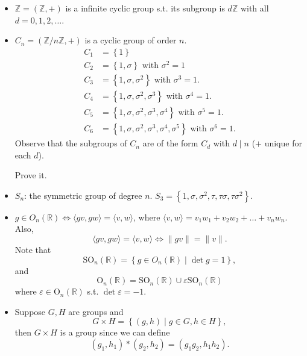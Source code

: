 \begin{prev}
    \vphantom{text}
    \begin{itemize}
        \item \(\mathbb{Z} = (\mathbb{Z} , +)\) is a infinite cyclic group s.t. its subgroup is \(d \mathbb{Z} \) with all \(d = 0, 1, 2, \dots \). 
        \item \(C_n = (\mathbb{Z} / n \mathbb{Z} , +)\) is a cyclic group of order \(n\).
        \begin{align*}
            C_1 &= \left\{ 1 \right\} \\
            C_2 &= \left\{ 1, \sigma  \right\} \text{ with } \sigma ^2 = 1 \\
            C_3 &= \left\{ 1, \sigma , \sigma ^2 \right\} \text{ with } \sigma ^3 = 1.  \\
            C_4 &= \left\{ 1, \sigma , \sigma ^2, \sigma ^3 \right\} \text{ with } \sigma ^4 = 1. \\
            C_5 &= \left\{ 1, \sigma , \sigma ^2, \sigma ^3, \sigma ^4 \right\}  \text{ with } \sigma ^5 = 1. \\
            C_6 &= \left\{ 1, \sigma , \sigma ^2, \sigma ^3, \sigma ^4, \sigma ^5 \right\}  \text{ with } \sigma ^6 = 1. 
        \end{align*}
            Observe that the subgroups of \(C_n\) are of the form \(C_d\) with \(d \mid n\) (\(+\) unique for each \(d\)).
    \begin{exercise}
    Prove it.
    \end{exercise}   
    \item \(S_n\): the symmetric group of degree \(n\). \(S_3 = \left\{ 1, \sigma , \sigma ^2, \tau , \tau \sigma , \tau \sigma ^2 \right\} \).  
    \item \(g \in O_n(\mathbb{R} ) \iff \langle gv, gw \rangle = \langle v, w \rangle  \), where \(\langle v,w \rangle = v_1 w_1 + v_2 w_2 + \dots + v_n w_n \). Also,
    \[
        \langle gv ,gw \rangle = \langle v,w \rangle \iff \lVert gv \rVert = \lVert v \rVert.  
    \]
    Note that 
\[
    \mathrm{SO}_n(\mathbb{R}) = \left\{ g \in O_n(\mathbb{R} ) \mid \det g = 1 \right\},  
\] and 
\[
    \mathrm{O} _n(\mathbb{R} ) = \mathrm{SO}_n(\mathbb{R} ) \cup \varepsilon  \mathrm{SO}_n(\mathbb{R} )  
\]where \(\varepsilon \in \mathrm{O}_n(\mathbb{R} ) \) s.t. \(\det \varepsilon = -1\).  
    \item Suppose \(G, H\) are groups and 
    \[
        G \times H = \left\{ (g, h) \mid g \in G, h \in H \right\}, 
    \] then \(G \times H\) is a group since we can define 
    \[
        (g_1, h_1) * (g_2, h_2) = (g_1 g_2, h_1 h_2).
    \]

    \end{itemize}
\end{prev}

